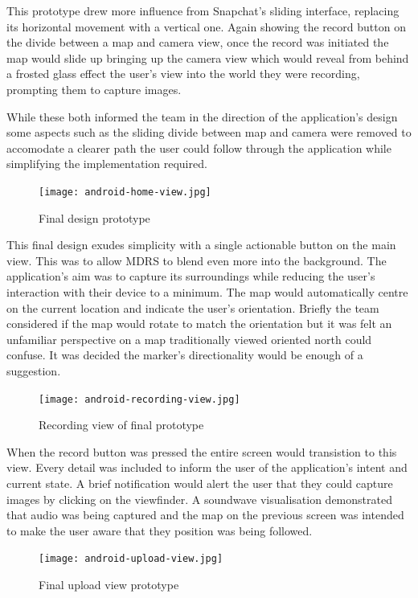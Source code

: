 \documentclass{l3proj}
\begin{document}
This prototype drew more influence from Snapchat’s sliding interface, replacing
its horizontal movement with a vertical one. Again showing the record button on
the divide between a map and camera view, once the record was initiated the map
would slide up bringing up the camera view which would reveal from behind a
frosted glass effect the user's view into the world they were recording,
prompting them to capture images.

While these both informed the team in the direction of the application's design some aspects such as the sliding divide between map and camera were removed to accomodate a clearer path the user could follow through the application while simplifying the implementation required.

\begin{figure}[ht!]
\centering
\texttt{[image: android-home-view.jpg]}
\caption{Final design prototype}
\label{overflow}
\end{figure}

This final design exudes simplicity with a single actionable button on the main view. This was to allow MDRS to blend even more into the background. The application's aim was to capture its surroundings while reducing the user's interaction with their device to a minimum. The map would automatically centre on the current location and indicate the user's orientation. Briefly the team considered if the map would rotate to match the orientation but it was felt an unfamiliar perspective on a map traditionally viewed oriented north could confuse. It was decided the marker's directionality would be enough of a suggestion.

\begin{figure}[ht!]
\centering
\texttt{[image: android-recording-view.jpg]}
\caption{Recording view of final prototype}
\label{overflow}
\end{figure}

When the record button was pressed the entire screen would transistion to this view. Every detail was included to inform the user of the application's intent and current state. A brief notification would alert the user that they could capture images by clicking on the viewfinder. A soundwave visualisation demonstrated that audio was being captured and the map on the previous screen was intended to make the user aware that they position was being followed.

\begin{figure}[ht!]
\centering
\texttt{[image: android-upload-view.jpg]}
\caption{Final upload view prototype}
\label{overflow}
\end{figure}
\end{document}
